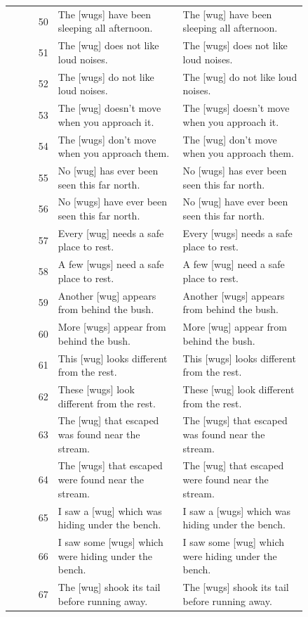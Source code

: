 \begin{longtable}{@{}rp{0.42\linewidth}p{0.42\linewidth}@{}}
50 & The {[}wugs{]} have been sleeping all afternoon. & The {[}wug{]} have been sleeping all afternoon. \\
51 & The {[}wug{]} does not like loud noises. & The {[}wugs{]} does not like loud noises. \\
52 & The {[}wugs{]} do not like loud noises. & The {[}wug{]} do not like loud noises. \\
53 & The {[}wug{]} doesn't move when you approach it. & The {[}wugs{]} doesn't move when you approach it. \\
54 & The {[}wugs{]} don't move when you approach them. & The {[}wug{]} don't move when you approach them. \\
55 & No {[}wug{]} has ever been seen this far north. & No {[}wugs{]} has ever been seen this far north. \\
56 & No {[}wugs{]} have ever been seen this far north. & No {[}wug{]} have ever been seen this far north. \\
57 & Every {[}wug{]} needs a safe place to rest. & Every {[}wugs{]} needs a safe place to rest. \\
58 & A few {[}wugs{]} need a safe place to rest. & A few {[}wug{]} need a safe place to rest. \\
59 & Another {[}wug{]} appears from behind the bush. & Another {[}wugs{]} appears from behind the bush. \\
60 & More {[}wugs{]} appear from behind the bush. & More {[}wug{]} appear from behind the bush. \\
61 & This {[}wug{]} looks different from the rest. & This {[}wugs{]} looks different from the rest. \\
62 & These {[}wugs{]} look different from the rest. & These {[}wug{]} look different from the rest. \\
63 & The {[}wug{]} that escaped was found near the stream. & The {[}wugs{]} that escaped was found near the stream. \\
64 & The {[}wugs{]} that escaped were found near the stream. & The {[}wug{]} that escaped were found near the stream. \\
65 & I saw a {[}wug{]} which was hiding under the bench. & I saw a {[}wugs{]} which was hiding under the bench. \\
66 & I saw some {[}wugs{]} which were hiding under the bench. & I saw some {[}wug{]} which were hiding under the bench. \\
67 & The {[}wug{]} shook its tail before running away. & The {[}wugs{]} shook its tail before running away. \\

\end{longtable}

